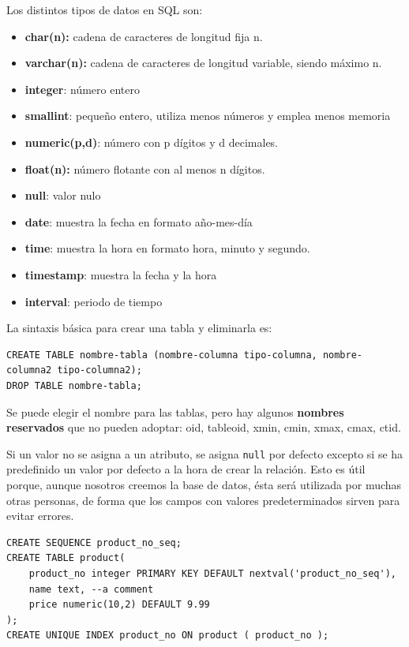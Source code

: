 Los distintos tipos de datos en SQL son:
\begin{itemize}
\item \textbf{char(n):} cadena de caracteres de longitud fija n.
\item \textbf{varchar(n):} cadena de caracteres de longitud variable, siendo máximo n.
\item \textbf{integer}: número entero
\item \textbf{smallint}: pequeño entero, utiliza menos números y emplea menos memoria
\item \textbf{numeric(p,d)}: número con p dígitos y d decimales.
\item \textbf{float(n):} número flotante con al menos n dígitos.
\item \textbf{null}: valor nulo
\item \textbf{date}: muestra la fecha en formato año-mes-día
\item \textbf{time}: muestra la hora en formato hora, minuto y segundo.
\item \textbf{timestamp}: muestra la fecha y la hora
\item \textbf{interval}: periodo de tiempo
\end{itemize}

La sintaxis básica para crear una tabla y eliminarla es:
\begin{lstlisting}
CREATE TABLE nombre-tabla (nombre-columna tipo-columna, nombre-columna2 tipo-columna2);
DROP TABLE nombre-tabla;
\end{lstlisting}

Se puede elegir el nombre para las tablas, pero hay algunos \textbf{nombres reservados} que no pueden adoptar: oid, tableoid, xmin, cmin, xmax, cmax, ctid.

Si un valor no se asigna a un atributo, se asigna \texttt{null} por defecto excepto si se ha predefinido un valor por defecto a la hora de crear la relación. Esto es útil porque, aunque nosotros creemos la base de datos, ésta será utilizada por muchas otras personas, de forma que los campos con valores predeterminados sirven para evitar errores.
\begin{lstlisting}
CREATE SEQUENCE product_no_seq; 
CREATE TABLE product(
	product_no integer PRIMARY KEY DEFAULT nextval('product_no_seq'),
	name text, --a comment
	price numeric(10,2) DEFAULT 9.99
);
CREATE UNIQUE INDEX product_no ON product ( product_no );
\end{lstlisting}

